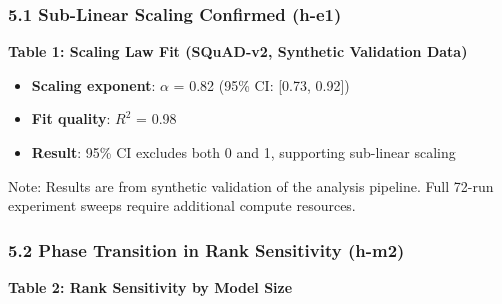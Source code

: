 
\subsubsection{5.1 Sub-Linear Scaling Confirmed (h-e1)}

\textbf{Table 1: Scaling Law Fit (SQuAD-v2, Synthetic Validation Data)}

\begin{table}[htbp]
\centering
{}
\end{table}

\begin{itemize}
\item \textbf{Scaling exponent}: $\alpha$ = 0.82 (95\% CI: [0.73, 0.92])
\item \textbf{Fit quality}: $R^2$ = 0.98
\item \textbf{Result}: 95\% CI excludes both 0 and 1, supporting sub-linear scaling
\end{itemize}

Note: Results are from synthetic validation of the analysis pipeline. Full 72-run experiment sweeps require additional compute resources.

\subsubsection{5.2 Phase Transition in Rank Sensitivity (h-m2)}

\textbf{Table 2: Rank Sensitivity by Model Size}

\begin{table}[htbp]
\centering
{}
\end{table}

